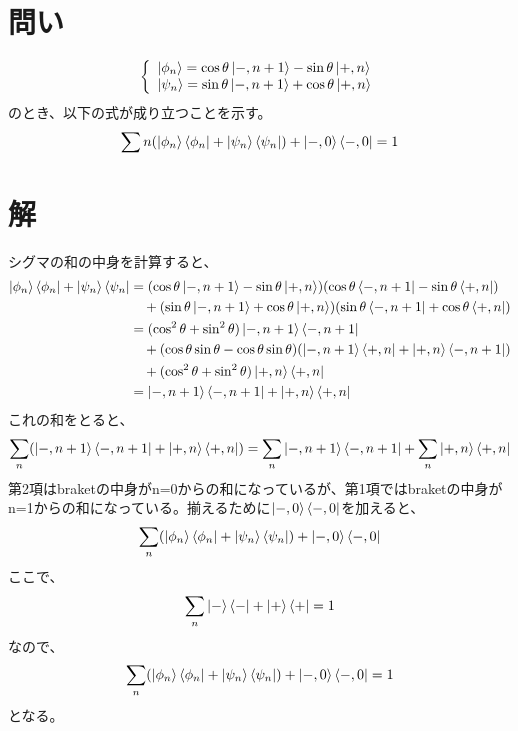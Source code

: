 \documentclass[10pt]{ujarticle}
\begin{document}
\section{問い}
\[
\left\{
\begin{array}{l}
  \ket{\phi_n} = \cos\theta \ket{-, n+1} - \sin\theta \ket{+, n}\\
  \ket{\psi_n} = \sin\theta \ket{-, n+1} + \cos\theta \ket{+, n}
  \end{array}
\right.
\]
のとき、以下の式が成り立つことを示す。
\begin{eqnarray*}
\sum{n} (\ket{\phi_n} \bra{\phi_n} +\ket{\psi_n} \bra{\psi_n}) + \ket{-, 0} \bra{-, 0} = 1
\end{eqnarray*}

\section{解}
シグマの和の中身を計算すると、
\begin{eqnarray*}
\begin{split}
\ket{\phi_n} \bra{\phi_n} +\ket{\psi_n} \bra{\psi_n} &= (\cos\theta \ket{-, n+1} - \sin\theta \ket{+, n})(\cos\theta \bra{-, n+1} - \sin\theta \bra{+, n}) \\
&\quad+ (\sin\theta \ket{-, n+1} + \cos\theta \ket{+, n})(\sin\theta \bra{-, n+1} + \cos\theta \bra{+, n}) \\
&= (\cos^2\theta + \sin^2\theta) \ket{-, n+1} \bra{-, n+1} \\
&\quad + (\cos\theta\sin\theta-\cos\theta\sin\theta)(\ket{-, n+1}\bra{+, n} + \ket{+, n} \bra{-, n+1}) \\
&\quad + (\cos^2\theta + \sin^2\theta) \ket{+, n} \bra{+, n} \\
&= \ket{-, n+1} \bra{-, n+1} + \ket{+, n} \bra{+, n}
\end{split}
\end{eqnarray*}
これの和をとると、
\begin{eqnarray*}
\sum_{n} (\ket{-, n+1} \bra{-, n+1} + \ket{+, n} \bra{+, n}) = \sum_{n} \ket{-, n+1} \bra{-, n+1} + \sum_{n} \ket{+, n} \bra{+, n}
\end{eqnarray*}
第2項はbraketの中身がn=0からの和になっているが、第1項ではbraketの中身がn=1からの和になっている。揃えるために$\ket{-, 0} \bra{-, 0}$を加えると、
\begin{eqnarray*}
\sum_{n} (\ket{\phi_n} \bra{\phi_n} +\ket{\psi_n} \bra{\psi_n}) + \ket{-, 0} \bra{-, 0} 
\end{eqnarray*}
ここで、
\begin{eqnarray*}
\sum_{n} \ket{-} \bra{-} + \ket{+} \bra{+} = 1
\end{eqnarray*}
なので、
\begin{eqnarray*}
\sum_{n} (\ket{\phi_n} \bra{\phi_n} +\ket{\psi_n} \bra{\psi_n}) + \ket{-, 0} \bra{-, 0} = 1
\end{eqnarray*}
となる。
\end{document}
